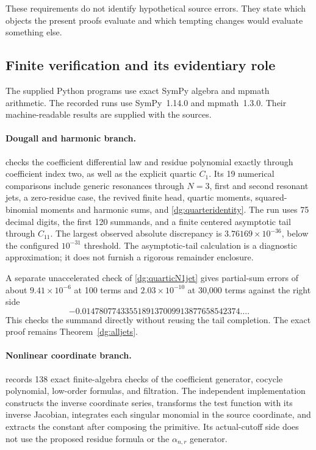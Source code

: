 These requirements do not identify hypothetical source errors. They
state which objects the present proofs evaluate and which tempting
changes would evaluate something else.

\subsection{Finite verification and its evidentiary role}
The supplied Python programs use exact SymPy algebra and mpmath
arithmetic. The recorded runs use SymPy~1.14.0 and mpmath~1.3.0.
Their machine-readable results are supplied with the sources.

\paragraph{Dougall and harmonic branch.}
 checks the coefficient differential
law and residue polynomial exactly through coefficient index two,
as well as the explicit quartic $C_1$. Its 19 numerical comparisons
include generic resonances through $N=3$, first and second resonant
jets, a zero-residue case, the revived finite head, quartic moments,
squared-binomial moments and harmonic sums, and
\eqref{dg:quarteridentity}. The run uses 75 decimal digits, the first
120 summands, and a finite centered asymptotic tail through $C_{11}$.
The largest observed absolute discrepancy is
$3.76169\times10^{-36}$, below the configured $10^{-31}$ threshold.
The asymptotic-tail calculation is a diagnostic approximation; it
does not furnish a rigorous remainder enclosure.

A separate unaccelerated check of \eqref{dg:quarticN1jet} gives
partial-sum errors of about $9.41\times10^{-6}$ at 100 terms and
$2.03\times10^{-10}$ at 30,000 terms against the right side
\[
-0.0147807743355189137009913877658542374\ldots.
\]
This checks the summand directly without reusing the tail completion.
The exact proof remains Theorem~\ref{dg:alljets}.

\paragraph{Nonlinear coordinate branch.}
 records 138 exact finite-algebra
checks of the coefficient generator, cocycle polynomial,
low-order formulas, and filtration. The independent implementation
 constructs the inverse coordinate
series, transforms the test function with its inverse Jacobian,
integrates each singular monomial in the source coordinate, and
extracts the constant after composing the primitive. Its actual-cutoff
side does not use the proposed residue formula or the
$\alpha_{n,r}$ generator.

